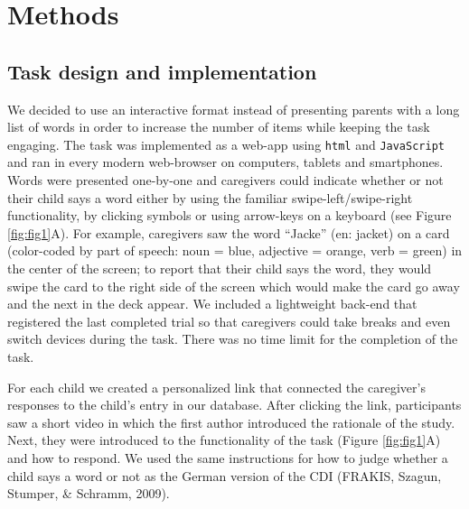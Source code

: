 \documentclass[
  man,floatsintext]{apa6}
\begin{document}
\hypertarget{methods}{%
\section{Methods}\label{methods}}

\hypertarget{task-design-and-implementation}{%
\subsection{Task design and implementation}\label{task-design-and-implementation}}

We decided to use an interactive format instead of presenting parents with a long list of words in order to increase the number of items while keeping the task engaging. The task was implemented as a web-app using \texttt{html} and \texttt{JavaScript} and ran in every modern web-browser on computers, tablets and smartphones. Words were presented one-by-one and caregivers could indicate whether or not their child says a word either by using the familiar swipe-left/swipe-right functionality, by clicking symbols or using arrow-keys on a keyboard (see Figure \ref{fig:fig1}A). For example, caregivers saw the word ``Jacke'' (en: jacket) on a card (color-coded by part of speech: noun = blue, adjective = orange, verb = green) in the center of the screen; to report that their child says the word, they would swipe the card to the right side of the screen which would make the card go away and the next in the deck appear. We included a lightweight back-end that registered the last completed trial so that caregivers could take breaks and even switch devices during the task. There was no time limit for the completion of the task.

For each child we created a personalized link that connected the caregiver's responses to the child's entry in our database. After clicking the link, participants saw a short video in which the first author introduced the rationale of the study. Next, they were introduced to the functionality of the task (Figure \ref{fig:fig1}A) and how to respond. We used the same instructions for how to judge whether a child says a word or not as the German version of the CDI (FRAKIS, Szagun, Stumper, \& Schramm, 2009).
\end{document}
